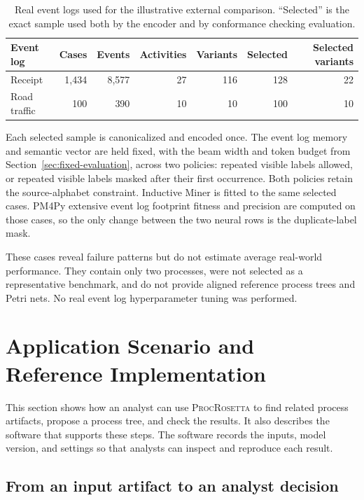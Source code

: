 \documentclass[mathematics,article,submit,moreauthors]{Definitions/mdpi}
\newcommand{\model}{\textsc{ProcRosetta}\xspace}
\begin{document}
\begin{table}[!b]
\centering
\caption{Real event logs used for the illustrative external comparison. ``Selected'' is the exact sample used both by the encoder and by conformance checking evaluation.}
\label{tab:real-log-data}
\begin{tabular}{@{}lrrrrrr@{}}
\toprule
Event log & Cases & Events & Activities & Variants & Selected & Selected variants \\
\midrule
Receipt & 1,434 & 8,577 & 27 & 116 & 128 & 22 \\
Road traffic & 100 & 390 & 10 & 10 & 100 & 10 \\
\bottomrule
\end{tabular}
\end{table}

Each selected sample is canonicalized and encoded once. The event log memory and semantic vector are held fixed, with the beam width and token budget from Section~\ref{sec:fixed-evaluation}, across two policies: repeated visible labels allowed, or repeated visible labels masked after their first occurrence. Both policies retain the source-alphabet constraint. Inductive Miner is fitted to the same selected cases. PM4Py extensive event log footprint fitness and precision are computed on those cases, so the only change between the two neural rows is the duplicate-label mask.

These cases reveal failure patterns but do not estimate average real-world performance. They contain only two processes, were not selected as a representative benchmark, and do not provide aligned reference process trees and Petri nets. No real event log hyperparameter tuning was performed.

\section{Application Scenario and Reference Implementation}\label{sec:reproduction}

This section shows how an analyst can use \model to find related process artifacts, propose a process tree, and check the results. It also describes the software that supports these steps. The software records the inputs, model version, and settings so that analysts can inspect and reproduce each result.

\subsection{From an input artifact to an analyst decision}
\end{document}

